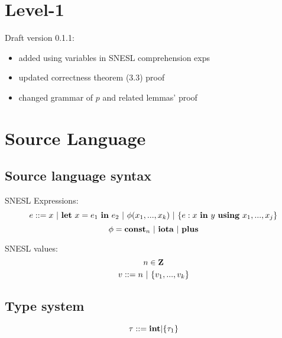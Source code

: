 \def\singl#1{\langle #1 \rangle}
\def\|->{\mapsto}   %
\def\>->{\rightarrowtail} %
\def\=>#1#2{\Rightarrow^{#1}_{#2}}


\def\sfun#1#2{(#1,#2)}

\def\Trans#1#2#3#4#5{#1 \Env #2 \=>{#3}{#4} #5}
\def\Transf#1#2#3#4#5{#1(#2) \=>{#3}{#4} #5}
 
 
\def\S{\mathbf{S}}
\def\Sin{\mathbf{S}_{in}}
\def\Sout{\mathbf{S}_{out}}
\def\FV#1{\mathtt{fv}(#1)}
\def\dv#1{\mathtt{dv}(#1)}


\newcommand{\eq}[2]{\begin{equation}\label{#1} #2\end{equation}}

\providecommand{\versionnumber}{0.1.1}


\section{Level-1}

\def\usevars{x_1,...,x_j}
\def\j#1{(#1)^j_{i=1}}
\def\k#1{(#1)^k_{i=1}}
\def\l#1{(#1)^l_{i=1}}


Draft version \versionnumber: 
\begin{itemize}
    \item added using variables in SNESL comprehension exps
    \item updated correctness theorem (3.3) proof
    \item changed grammar of $p$ and related lemmas' proof
\end{itemize}

\section{Source Language}

\subsection{Source language syntax}
SNESL Expressions:
$$e ::= x \ | \ \Let{x}{e_1}{e_2} \ | \ \hcall{\Tupk{x}} \ | \ \Comp{e}{x}{y}{\usevars} $$
$$\phi = \mathbf{const}_n \ | \ \mathbf{iota} \ | \ \mathbf{plus} $$ 

SNESL values: \\
$$ n \in \mathbf{Z} $$
$$ v::= n \ | \ \{ v_1,...,v_k \}$$

\subsection{Type system}
$$\tau ::= \mathbf{int} | \{\tau_1\}$$

